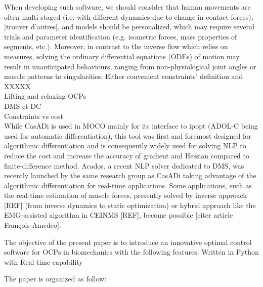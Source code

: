 When developing such software, we should consider that human movements are often multi-staged (i.e. with different dynamics due to change in contact forces), [trouver d’autres], and models should be personalized, which may require several trials and parameter identification (e.g. isometric forces, mass properties of segments, etc.). 
Moreover, in contrast to the inverse flow which relies on measures, solving the ordinary differential equations (ODEs) of motion may result in unanticipated behaviours, ranging from non-physiological joint angles or muscle patterns to singularities. Either convenient constraints’ definition  and XXXXX\\ 

Lifting and relaxing OCPs\\ 
DMS et DC\\
Constraints vs cost\\


While CasADi is used in MOCO mainly for its interface to ipopt (ADOL-C being used for automatic differentiation),  this tool was first and foremost designed for algorithmic differentiation and is consequently widely used for solving NLP to reduce the cost and increase the accuracy of gradient and Hessian compared to finite-difference method. Acados, a recent NLP solver dedicated to DMS, was recently launched by the same research group as CasADi taking advantage of the algorithmic differentiation for real-time applications. Some applications, such as the real-time estimation of muscle forces, presently solved by inverse approach [REF] (from inverse dynamics to static optimization) or hybrid approach like the EMG-assisted algorithm in CEINMS [REF], become possible [citer article François-Amedeo].


The objective of the present paper is to introduce an innovative optimal control software for OCPs in biomechanics with the following features: 
Written in Python with 
Real-time capability 



The paper is organized as follow: 

